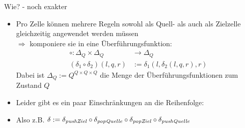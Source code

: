 \documentclass{beamer}
\begin{document}
\begin{frame}{Wie? - noch exakter}
    \begin{itemize}
        \item Pro Zelle können mehrere Regeln sowohl als Quell- als auch als Zielzelle gleichzeitig angewendet werden müssen\\
            $\Rightarrow$ komponiere sie in eine Überführungsfunktion:
            \begin{align*}
                \circ : \Delta_Q \times \Delta_Q &\rightarrow \Delta_Q \\
                (\delta_1 \circ \delta_2)(l,q,r) &:= \delta_1(l,\delta_2(l,q,r),r)
            \end{align*}
            Dabei ist $\Delta_Q := Q^{Q\times Q \times Q}$ die Menge der Überführungsfunktionen zum Zustand $Q$
        \item Leider gibt es ein paar Einschränkungen an die Reihenfolge:
            \begin{center}
            \end{center}
        \item Also z.B.
            $ \delta := \delta_{\mathit{pushZiel}} \circ \delta_{\mathit{popQuelle}} \circ \delta_{\mathit{popZiel}} \circ \delta_{\mathit{pushQuelle}} $
    \end{itemize}
\end{frame}
\end{document}
